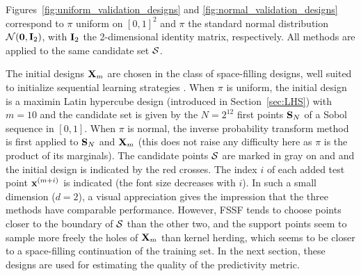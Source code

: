 Figures~\ref{fig:uniform_validation_designs} and \ref{fig:normal_validation_designs} correspond to $\pi$ uniform on $[0,1]^2$ and $\pi$ the standard normal distribution $\SN(\0b,\Ib_2)$, with $\mathbf{I}_2$ the 2-dimensional identity matrix, respectively. 
All methods are applied to the same candidate set $\mathcal{S}$. 

The initial designs ${\bf X}_m$ are chosen in the class of space-filling designs, well suited to initialize sequential learning strategies \citep{sanwil03}. 
When $\pi$ is uniform, the initial design is a maximin Latin hypercube design (introduced in Section~\ref{sec:LHS}) with $m=10$ and the candidate set is given by the $N=2^{12}$ first points $\mathbf{S}_N$ of a Sobol sequence in $[0,1]$. 
When $\pi$ is normal, the inverse probability transform method is first applied to $\mathbf{S}_N$ and ${\bf X}_m$ (this does not raise any difficulty here as $\pi$ is the product of its marginals). 
The candidate points $\mathcal{S}$ are marked in gray on  and  and the initial design is indicated by the red crosses. 
The index $i$ of each added test point ${\bf x}^{(m+i)}$ is indicated (the font size decreases with $i$). 
In such a small dimension ($d=2$), a visual appreciation gives the impression that the three methods have comparable performance. 
However, FSSF tends to choose points closer to the boundary of $\mathcal{S}$ than the other two, and the support points seem to sample more freely the holes of ${\bf X}_m$ than kernel herding, which seems to be closer to a space-filling continuation of the training set. 
In the next section, these designs are used for estimating the quality of the predictivity metric.



